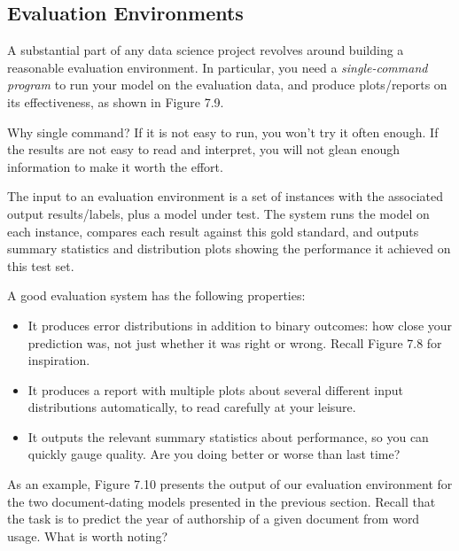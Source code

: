 \documentclass[10pt]{article}
\begin{document}
\subsection{Evaluation Environments}
A substantial part of any data science project revolves around building a reasonable evaluation environment. In particular, you need a \textit{single-command program} to run your model on the evaluation data, and produce plots/reports on its effectiveness, as shown in Figure 7.9. 

Why single command? If it is not easy to run, you won't try it often enough. If the results are not easy to read and interpret, you will not glean enough information to make it worth the effort.

The input to an evaluation environment is a set of instances with the associated output results/labels, plus a model under test. The system runs the model on each instance, compares each result against this gold standard, and outputs summary statistics and distribution plots showing the performance it achieved on this test set.

A good evaluation system has the following properties:
\begin{itemize}
  \item It produces error distributions in addition to binary outcomes: how close your prediction was, not just whether it was right or wrong. Recall Figure 7.8 for inspiration.
  \item It produces a report with multiple plots about several different input distributions automatically, to read carefully at your leisure.
  \item It outputs the relevant summary statistics about performance, so you can quickly gauge quality. Are you doing better or worse than last time?
\end{itemize}

As an example, Figure 7.10 presents the output of our evaluation environment for the two document-dating models presented in the previous section. Recall that the task is to predict the year of authorship of a given document from word usage. What is worth noting?
\end{document}

